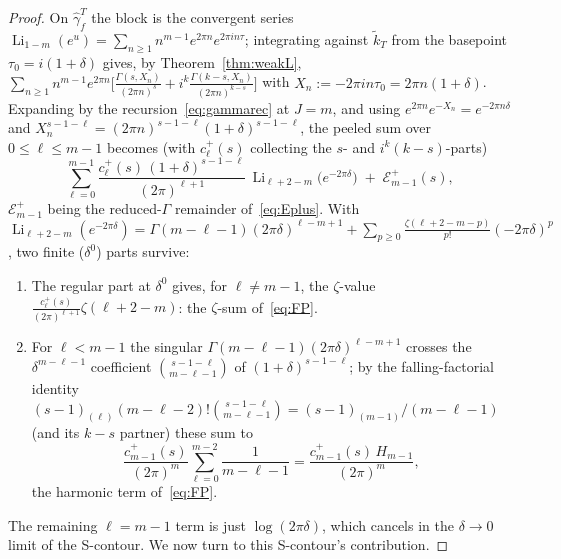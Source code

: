 \documentclass[11pt]{article}
\newcommand{\tk}{\widetilde{k}_T}
\DeclareMathOperator{\Li}{Li}
\begin{document}
\begin{proof}
On $\hat\gamma_f^T$ the block is the convergent series
$\Li_{1-m}(e^{u})=\sum_{n\ge1}n^{m-1}e^{2\pi n}e^{2\pi in\tau}$; integrating against $\tk$ from the
basepoint $\tau_0=i(1+\delta)$ gives, by Theorem~\ref{thm:weakL},
$\sum_{n\ge1}n^{m{-}1} e^{2\pi n}\big[\tfrac{\Gamma(s,X_n)}{(2\pi n)^{s}}+i^k\tfrac{\Gamma(k-s,X_n)}{(2\pi n)^{k-s}}\big]$
with $X_n:=-2\pi in\tau_0=2\pi n(1+\delta)$. Expanding by the recursion~\eqref{eq:gammarec} at $J=m$, and using
$e^{2\pi n}e^{-X_n}=e^{-2\pi n\delta}$ and $X_n^{s-1-\ell}=(2\pi n)^{s-1-\ell}(1+\delta)^{s-1-\ell}$, the
peeled sum over $0\le\ell\le m-1$ becomes (with $c^+_\ell(s)$ collecting the $s$- and $i^k(k{-}s)$-parts)
\begin{equation}\label{eq:Tsum}
\sum_{\ell=0}^{m-1}\frac{c^+_\ell(s)\,(1+\delta)^{s-1-\ell}}{(2\pi)^{\ell+1}}\,\Li_{\ell+2-m}\!\big(e^{-2\pi\delta}\big)
\;+\;\mathcal E^+_{m-1}(s),
\end{equation}
$\mathcal E^+_{m-1}$ being the reduced-$\Gamma$ remainder of~\eqref{eq:Eplus}. %
%
With
$\Li_{\ell+2-m}(e^{-2\pi\delta})=\Gamma(m-\ell-1)(2\pi\delta)^{\ell-m+1}+\sum_{p\ge0}\tfrac{\zeta(\ell+2-m-p)}{p!}(-2\pi\delta)^p$,
two finite ($\delta^0$) parts survive:
\begin{enumerate}
\item The regular part at $\delta^0$ gives, for $\ell\ne m-1$, the $\zeta$-value
$\tfrac{c^+_\ell(s)}{(2\pi)^{\ell+1}}\zeta(\ell+2-m)$: the $\zeta$-sum of~\eqref{eq:FP}.
\item For $\ell<m-1$ the singular $\Gamma(m-\ell-1)(2\pi\delta)^{\ell-m+1}$ crosses the $\delta^{m-\ell-1}$ coefficient
$\binom{s-1-\ell}{m-\ell-1}$ of $(1+\delta)^{s-1-\ell}$; by the falling-factorial identity
$(s-1)_{(\ell)}(m-\ell-2)!\binom{s-1-\ell}{m-\ell-1}=(s-1)_{(m-1)}/(m-\ell-1)$ (and its $k{-}s$ partner) these sum to
\begin{equation}\label{eq:harm}
\frac{c^+_{m-1}(s)}{(2\pi)^{m}}\sum_{\ell=0}^{m-2}\frac{1}{m-\ell-1}=\frac{c^+_{m-1}(s)\,H_{m-1}}{(2\pi)^{m}},
\end{equation}
the harmonic term of~\eqref{eq:FP}.
\end{enumerate}
The remaining $\ell=m-1$ term is just $\log(2\pi\delta)$, which cancels in the
$\delta\to0$ limit of the S-contour. We now turn to this S-contour's contribution. 


\end{proof}
\end{document}
